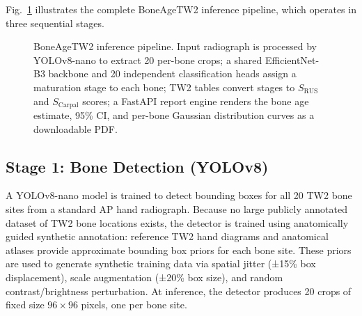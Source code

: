 \documentclass[journal]{IEEEtran}
\begin{document}
Fig.~\ref{fig:pipeline} illustrates the complete BoneAgeTW2
inference pipeline, which operates in three sequential stages.

\begin{figure}[!t]
\centering
{}
\caption{BoneAgeTW2 inference pipeline. Input radiograph is processed
by YOLOv8-nano to extract 20 per-bone crops; a shared EfficientNet-B3
backbone and 20 independent classification heads assign a maturation
stage to each bone; TW2 tables convert stages to $S_{\text{RUS}}$
and $S_{\text{Carpal}}$ scores; a FastAPI report engine renders the
bone age estimate, 95\% CI, and per-bone Gaussian distribution curves
as a downloadable PDF.}
\label{fig:pipeline}
\end{figure}

\subsection{Stage 1: Bone Detection (YOLOv8)}

A YOLOv8-nano model is trained to detect bounding boxes for all
20 TW2 bone sites from a standard AP hand radiograph.
Because no large publicly annotated dataset of TW2 bone locations
exists, the detector is trained using anatomically guided synthetic
annotation: reference TW2 hand diagrams and anatomical atlases
provide approximate bounding box priors for each bone site.
These priors are used to generate synthetic training data via
spatial jitter (±15\% box displacement), scale augmentation
(±20\% box size), and random contrast/brightness perturbation.
At inference, the detector produces 20 crops of fixed size
$96 \times 96$ pixels, one per bone site.
\end{document}

